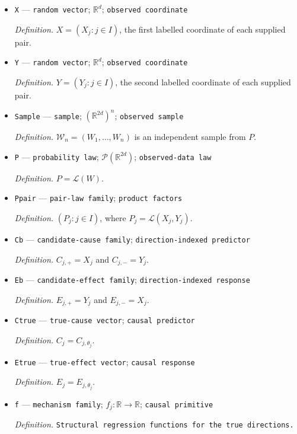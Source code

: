 \documentclass{article}
\begin{document}
\begin{itemize}
  \item \texttt{X} --- \texttt{random vector}; \(\mathbb R^d\); \texttt{observed coordinate}
  \par\smallskip\noindent\emph{Definition.} \(X=(X_j:j\in I)\), the first labelled coordinate of each supplied pair.
  \item \texttt{Y} --- \texttt{random vector}; \(\mathbb R^d\); \texttt{observed coordinate}
  \par\smallskip\noindent\emph{Definition.} \(Y=(Y_j:j\in I)\), the second labelled coordinate of each supplied pair.
  \item \texttt{Sample} --- \texttt{sample}; \((\mathbb R^{2d})^n\); \texttt{observed sample}
  \par\smallskip\noindent\emph{Definition.} \(\mathcal W_n=(W_1,\ldots,W_n)\) is an independent sample from \(P\).
  \item \texttt{P} --- \texttt{probability law}; \(\mathcal P(\mathbb R^{2d})\); \texttt{observed-\allowbreak{}data law}
  \par\smallskip\noindent\emph{Definition.} \(P=\mathcal L(W)\).
  \item \texttt{Ppair} --- \texttt{pair-\allowbreak{}law family}; \texttt{product factors}
  \par\smallskip\noindent\emph{Definition.} \((P_j:j\in I)\), where \(P_j=\mathcal L(X_j,Y_j)\).
  \item \texttt{Cb} --- \texttt{candidate-\allowbreak{}cause family}; \texttt{direction-\allowbreak{}indexed predictor}
  \par\smallskip\noindent\emph{Definition.} \(C_{j,+}=X_j\) and \(C_{j,-}=Y_j\).
  \item \texttt{Eb} --- \texttt{candidate-\allowbreak{}effect family}; \texttt{direction-\allowbreak{}indexed response}
  \par\smallskip\noindent\emph{Definition.} \(E_{j,+}=Y_j\) and \(E_{j,-}=X_j\).
  \item \texttt{Ctrue} --- \texttt{true-\allowbreak{}cause vector}; \texttt{causal predictor}
  \par\smallskip\noindent\emph{Definition.} \(C_j=C_{j,\theta_j}\).
  \item \texttt{Etrue} --- \texttt{true-\allowbreak{}effect vector}; \texttt{causal response}
  \par\smallskip\noindent\emph{Definition.} \(E_j=E_{j,\theta_j}\).
  \item \texttt{f} --- \texttt{mechanism family}; \(f_j:\mathbb R\to\mathbb R\); \texttt{causal primitive}
  \par\smallskip\noindent\emph{Definition.} \texttt{Structural regression functions for the true directions.}

\end{itemize}
\end{document}

